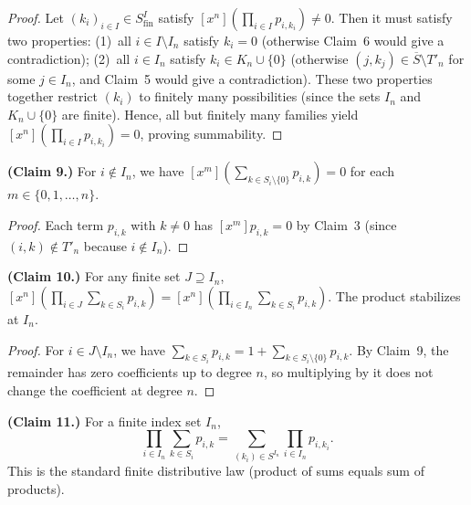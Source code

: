 \begin{proof}
\leanok
Let $(k_i)_{i \in I} \in S^I_{\mathrm{fin}}$ satisfy
$[x^n](\prod_{i \in I} p_{i,k_i}) \neq 0$.
Then it must satisfy two properties:
(1)~all $i \in I \setminus I_n$ satisfy $k_i = 0$
(otherwise Claim~6 would give a contradiction);
(2)~all $i \in I_n$ satisfy $k_i \in K_n \cup \{0\}$
(otherwise $(j, k_j) \in \overline{S} \setminus T'_n$ for some
$j \in I_n$, and Claim~5 would give a contradiction).
These two properties together restrict $(k_i)$ to finitely many
possibilities (since the sets $I_n$ and $K_n \cup \{0\}$ are finite).
Hence, all but finitely many families yield
$[x^n](\prod_{i \in I} p_{i,k_i}) = 0$, proving summability.
\end{proof}

\begin{lemma}
\label{lem.fps.infprod.claim9}
\leanhelper
\leanok
\textbf{(Claim 9.)}
For $i \notin I_n$, we have $[x^m](\sum_{k \in S_i \setminus \{0\}} p_{i,k}) = 0$
for each $m \in \{0,1,\ldots,n\}$.
\end{lemma}

\begin{proof}
\leanok
Each term $p_{i,k}$ with $k \neq 0$ has $[x^m] p_{i,k} = 0$ by Claim~3
(since $(i,k) \notin T'_n$ because $i \notin I_n$).
\end{proof}

\begin{lemma}
\label{lem.fps.infprod.claim10}
\leanhelper
\leanok
\textbf{(Claim 10.)}
For any finite set $J \supseteq I_n$,
$[x^n](\prod_{i \in J} \sum_{k \in S_i} p_{i,k}) = [x^n](\prod_{i \in I_n} \sum_{k \in S_i} p_{i,k})$.
The product stabilizes at $I_n$.
\end{lemma}

\begin{proof}
\leanok
For $i \in J \setminus I_n$, we have $\sum_{k \in S_i} p_{i,k} = 1 + \sum_{k \in S_i \setminus \{0\}} p_{i,k}$.
By Claim~9, the remainder has zero coefficients up to degree $n$, so multiplying by it
does not change the coefficient at degree $n$.
\end{proof}

\begin{lemma}
\label{lem.fps.infprod.claim11}
\leanhelper
\leanok
\textbf{(Claim 11.)} For a finite index set $I_n$,
\[
\prod_{i \in I_n} \sum_{k \in S_i} p_{i,k} =
\sum_{(k_i) \in S^{I_n}} \prod_{i \in I_n} p_{i,k_i}.
\]
This is the standard finite distributive law (product of sums equals sum of products).
\end{lemma}

